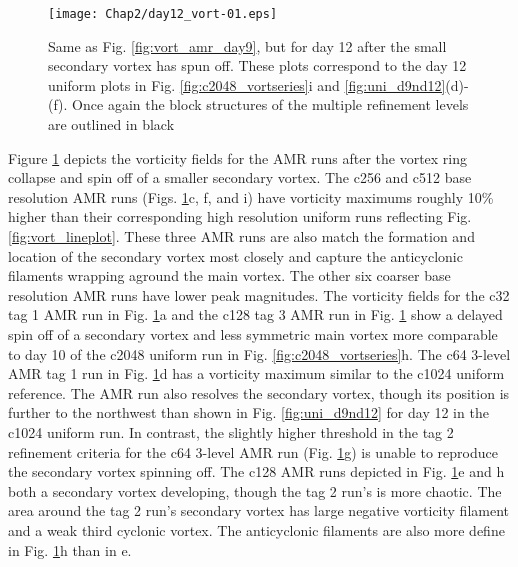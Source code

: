 \begin{figure}
   \centerline{%
   \noindent
   \texttt{[image: Chap2/day12\_vort-01.eps]}}
   \caption{Same as Fig. \ref{fig:vort_amr_day9}, but for day 12 after the small
   secondary vortex has spun off. These plots correspond to the day 12 uniform
   plots in Fig. \ref{fig:c2048_vortseries}i and \ref{fig:uni_d9nd12}(d)-(f). Once
   again the block structures of the multiple refinement
   levels are outlined in black
   }
   \label{fig:vort_amr_day12}
\end{figure}

Figure \ref{fig:vort_amr_day12} depicts the vorticity fields for the AMR runs after the vortex ring collapse
and spin off of a smaller secondary vortex. The c256 and c512 base resolution AMR runs (Figs.
\ref{fig:vort_amr_day12}c, f, and i) have vorticity 
maximums roughly 10\% higher than their corresponding high resolution 
uniform runs reflecting Fig. \ref{fig:vort_lineplot}. These three AMR runs are also match
the formation and location of the secondary vortex most closely and capture the anticyclonic
 filaments wrapping aground the main vortex.
The other six coarser base resolution AMR runs have lower peak magnitudes. The 
vorticity fields for the c32 tag 1 AMR run in Fig. \ref{fig:vort_amr_day12}a and the
c128 tag 3 AMR run in Fig. \ref{fig:vort_amr_day12} show a delayed spin off of 
a secondary vortex and less symmetric main vortex more 
comparable to day 10 of the c2048 uniform run in Fig. \ref{fig:c2048_vortseries}h.
The c64 3-level AMR tag 1 run in Fig. \ref{fig:vort_amr_day12}d has a vorticity 
maximum similar to the c1024 uniform reference. The AMR run also resolves 
the secondary vortex, though its position is further to the northwest than shown
in Fig. \ref{fig:uni_d9nd12} for day 12 in the c1024 uniform run. In contrast,
the slightly higher threshold in the tag 2 refinement criteria 
for the c64 3-level AMR run (Fig. \ref{fig:vort_amr_day12}g) 
is unable to reproduce the secondary vortex spinning off. The
c128 AMR runs depicted in Fig. \ref{fig:vort_amr_day12}e and h both
a secondary vortex developing, though the tag 2 run's is more chaotic.
The area around the tag 2 run's secondary vortex has large negative 
vorticity filament and a weak third cyclonic vortex.
The anticyclonic filaments are also more define in Fig. \ref{fig:vort_amr_day12}h 
than in e. 

